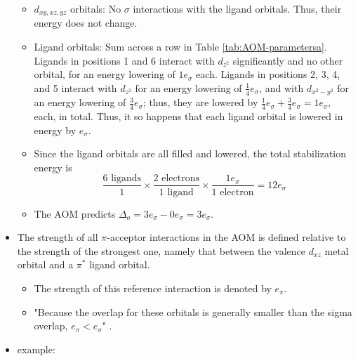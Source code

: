 \documentclass[../notes.tex]{subfiles}
\begin{document}
\begin{itemize}
\begin{itemize}
        \item $d_{xy,xz,yz}$ orbitals: No $\sigma$ interactions with the ligand orbitals. Thus, their energy does not change.
        \item Ligand orbitals: Sum across a row in Table \ref{tab:AOM-parametersa}. Ligands in positions 1 and 6 interact with $d_{z^2}$ significantly and no other orbital, for an energy lowering of $1e_\sigma$ each. Ligands in positions 2, 3, 4, and 5 interact with $d_{z^2}$ for an energy lowering of $\frac{1}{4}e_\sigma$, and with $d_{x^2-y^2}$ for an energy lowering of $\frac{3}{4}e_\sigma$; thus, they are lowered by $\frac{1}{4}e_\sigma+\frac{3}{4}e_\sigma=1e_\sigma$, each, in total. Thus, it so happens that each ligand orbital is lowered in energy by $e_\sigma$.
        \item Since the ligand orbitals are all filled and lowered, the total stabilization energy is
        \begin{equation*}
            \frac{6\text{ ligands}}{1}\times\frac{2\text{ electrons}}{1\text{ ligand}}\times\frac{1e_\sigma}{1\text{ electron}} = 12e_\sigma
        \end{equation*}
        \item The AOM predicts $\Delta_o=3e_\sigma-0e_\sigma=3e_\sigma$.
    \end{itemize}
    \item The strength of all $\pi$-acceptor interactions in the AOM is defined relative to the strength of the strongest one, namely that between the valence $d_{xz}$ metal orbital and a $\pi^*$ ligand orbital.
    \begin{itemize}
        \item The strength of this reference interaction is denoted by $e_\pi$.
        \item "Because the overlap for these orbitals is generally smaller than the sigma overlap, $e_\pi<e_\sigma$" \parencite[385]{bib:MiesslerFischerTarr}.
    \end{itemize}
    \item {} example:
    \begin{figure}[h!]
        \centering
        \footnotesize
\end{figure}
\end{itemize}
\end{document}
